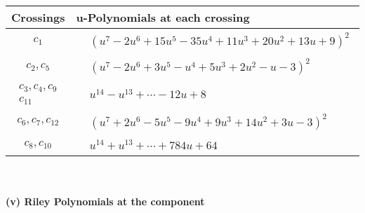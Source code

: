 \documentclass[1p]{elsarticle_modified}
\theoremstyle{definition}
\begin{document}
\begin{tabular}{m{50pt}|m{274pt}}
Crossings & \hspace{64pt}u-Polynomials at each crossing \\
\hline $$\begin{aligned}c_{1}\end{aligned}$$&$\begin{aligned}
&(u^7-2 u^6+15 u^5-35 u^4+11 u^3+20 u^2+13 u+9)^2
\end{aligned}$\\
\hline $$\begin{aligned}c_{2},c_{5}\end{aligned}$$&$\begin{aligned}
&(u^7-2 u^6+3 u^5- u^4+5 u^3+2 u^2- u-3)^2
\end{aligned}$\\
\hline $$\begin{aligned}c_{3},c_{4},c_{9}\\c_{11}\end{aligned}$$&$\begin{aligned}
&u^{14}- u^{13}+\cdots-12 u+8
\end{aligned}$\\
\hline $$\begin{aligned}c_{6},c_{7},c_{12}\end{aligned}$$&$\begin{aligned}
&(u^7+2 u^6-5 u^5-9 u^4+9 u^3+14 u^2+3 u-3)^2
\end{aligned}$\\
\hline $$\begin{aligned}c_{8},c_{10}\end{aligned}$$&$\begin{aligned}
&u^{14}+u^{13}+\cdots+784 u+64
\end{aligned}$\\
\hline
\end{tabular}\\~\\
\newpage\renewcommand{\arraystretch}{1}
\flushleft \textbf{(v) Riley Polynomials at the component}\newline \\
\end{document}
